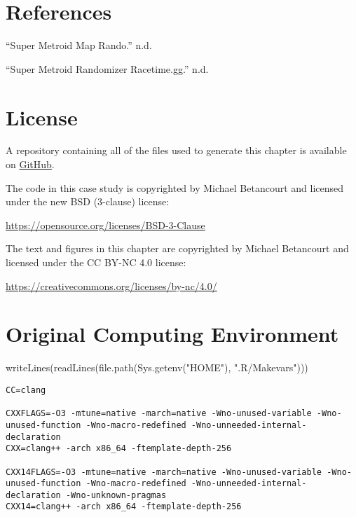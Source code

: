 \documentclass[
  letterpaper,
  DIV=11,
  numbers=noendperiod]{scrartcl}
\newenvironment{Shaded}{\begin{snugshade}}{\end{snugshade}}
\newcommand{\FunctionTok}[1]{\textcolor[rgb]{0.28,0.35,0.67}{#1}}
\newcommand{\NormalTok}[1]{\textcolor[rgb]{0.00,0.23,0.31}{#1}}
\newcommand{\StringTok}[1]{\textcolor[rgb]{0.13,0.47,0.30}{#1}}
\newlength{\cslhangindent}
\newenvironment{CSLReferences}[2] %
 {\begin{list}{}{%
  \setlength{\itemindent}{0pt}
  \setlength{\leftmargin}{0pt}
  \setlength{\parsep}{0pt}
  \ifodd #1
   \setlength{\leftmargin}{\cslhangindent}
   \setlength{\itemindent}{-1\cslhangindent}
  \fi
  \setlength{\itemsep}{#2\baselineskip}}}
 {\end{list}}
\begin{document}
\section*{References}\label{references}

\label{refs}
\begin{CSLReferences}{1}{0}
{``Super Metroid Map Rando.''} n.d.

{``Super Metroid Randomizer \textbar{} Racetime.gg.''} n.d.

\end{CSLReferences}

\section*{License}\label{license}

A repository containing all of the files used to generate this chapter
is available on
\href{https://github.com/betanalpha/quarto_chapters/tree/main/case_studies/racing}{GitHub}.

The code in this case study is copyrighted by Michael Betancourt and
licensed under the new BSD (3-clause) license:

\url{https://opensource.org/licenses/BSD-3-Clause}

The text and figures in this chapter are copyrighted by Michael
Betancourt and licensed under the CC BY-NC 4.0 license:

\url{https://creativecommons.org/licenses/by-nc/4.0/}

\section*{Original Computing
Environment}\label{original-computing-environment}

\begin{Shaded}
\begin{Highlighting}[]
\FunctionTok{writeLines}\NormalTok{(}\FunctionTok{readLines}\NormalTok{(}\FunctionTok{file.path}\NormalTok{(}\FunctionTok{Sys.getenv}\NormalTok{(}\StringTok{"HOME"}\NormalTok{), }\StringTok{".R/Makevars"}\NormalTok{)))}
\end{Highlighting}
\end{Shaded}

\begin{verbatim}
CC=clang

CXXFLAGS=-O3 -mtune=native -march=native -Wno-unused-variable -Wno-unused-function -Wno-macro-redefined -Wno-unneeded-internal-declaration
CXX=clang++ -arch x86_64 -ftemplate-depth-256

CXX14FLAGS=-O3 -mtune=native -march=native -Wno-unused-variable -Wno-unused-function -Wno-macro-redefined -Wno-unneeded-internal-declaration -Wno-unknown-pragmas
CXX14=clang++ -arch x86_64 -ftemplate-depth-256
\end{verbatim}
\end{document}
